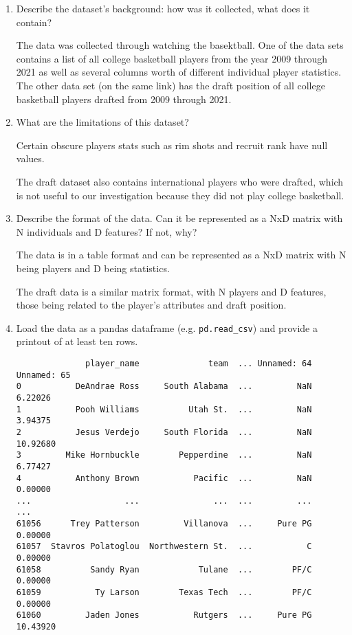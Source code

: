 \documentclass[12pt]{article}
\begin{document}
\begin{enumerate}[itemsep=0em,label={(\alph*)}]
\item Describe the dataset's background: how was it collected, what does it contain?

The data was collected through watching the basektball. One of the data sets contains a list of all college basketball players from the year 2009 through 2021 as well as several columns worth of different individual player statistics. The other data set (on the same link) has the draft position of all college basketball players drafted from 2009 through 2021.

\item What are the limitations of this dataset? 

Certain obscure players stats such as rim shots and recruit rank have null values.

The draft dataset also contains international players who were drafted, which is not useful to our investigation because they did not play college basketball.

\item Describe the format of the data. Can it be represented as a NxD matrix with N individuals and D features? If not, why?

The data is in a table format and can be represented as a NxD matrix with N being players and D being statistics.

The draft data is a similar matrix format, with N players and D features, those being related to the player's attributes and draft position.

\item Load the data as a pandas dataframe (e.g. {\tt pd.read\_csv}) and provide a printout of at least ten rows.
\begin{verbatim}
              player_name              team  ... Unnamed: 64  Unnamed: 65
0           DeAndrae Ross     South Alabama  ...         NaN      6.22026
1           Pooh Williams          Utah St.  ...         NaN      3.94375
2           Jesus Verdejo     South Florida  ...         NaN     10.92680
3         Mike Hornbuckle        Pepperdine  ...         NaN      6.77427
4           Anthony Brown           Pacific  ...         NaN      0.00000
...                   ...               ...  ...         ...          ...
61056      Trey Patterson         Villanova  ...     Pure PG      0.00000
61057  Stavros Polatoglou  Northwestern St.  ...           C      0.00000
61058          Sandy Ryan            Tulane  ...        PF/C      0.00000
61059           Ty Larson        Texas Tech  ...        PF/C      0.00000
61060         Jaden Jones           Rutgers  ...     Pure PG     10.43920
\end{verbatim}


\end{enumerate}
\end{document}
